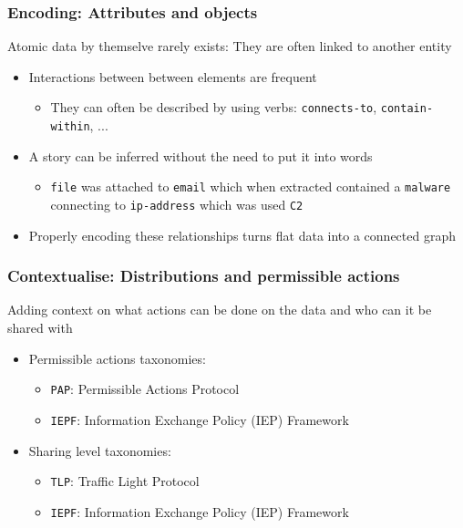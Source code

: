 \begin{frame}
    \frametitle{Encoding: Attributes and objects}
    Atomic data by themselve rarely exists: They are often linked to another entity
    \begin{itemize}
        \item Interactions between between elements are frequent
        \begin{itemize}
            \item They can often be described by using verbs: \texttt{connects-to}, \texttt{contain-within}, ...
        \end{itemize}
        \item A story can be inferred without the need to put it into words
        \begin{itemize}
            \item \texttt{file} was attached to \texttt{email} which when extracted contained a \texttt{malware} connecting to \texttt{ip-address} which was used \texttt{C2}
        \end{itemize}
        \item Properly encoding these relationships turns flat data into a connected graph
    \end{itemize}
\end{frame}


\begin{frame}
    \frametitle{Contextualise: Distributions and permissible actions}
    Adding context on what actions can be done on the data and who can it be shared with
    \begin{itemize}
        \item Permissible actions taxonomies:
        \begin{itemize}
            \item \texttt{PAP}: Permissible Actions Protocol
            \item \texttt{IEPF}: Information Exchange Policy (IEP) Framework
        \end{itemize}
        \item Sharing level taxonomies:
        \begin{itemize}
            \item \texttt{TLP}: Traffic Light Protocol
            \item \texttt{IEPF}: Information Exchange Policy (IEP) Framework
        \end{itemize}
    \end{itemize}
\end{frame}

